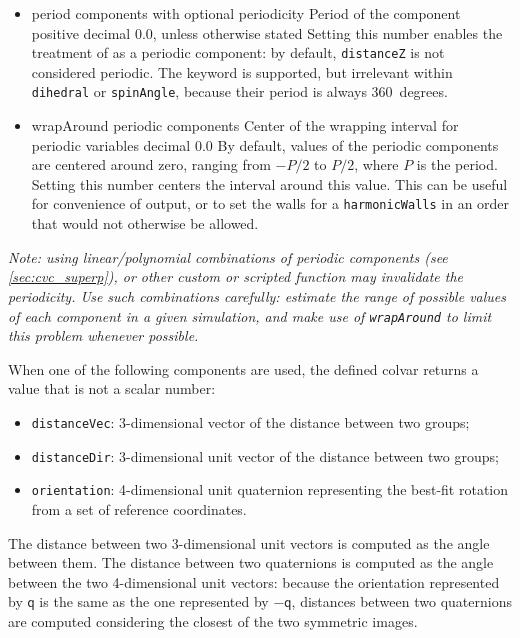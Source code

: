 \begin{itemize}
\item %
  \keydef
    {period}{%
    components with optional periodicity}{%
    Period of the component}{%
    positive decimal}{%
    0.0, unless otherwise stated}{%
    Setting this number enables the treatment of as
    a periodic component: by default, \texttt{distanceZ} is not
    considered periodic.  The keyword is supported, but irrelevant
    within \texttt{dihedral} or \texttt{spinAngle}, because their
    period is always 360~degrees.}

\item %
  \keydef
    {wrapAround}{%
    periodic components}{%
    Center of the wrapping interval for periodic variables}{%
    decimal}{%
    0.0}{%
    By default, values of the periodic components are centered around zero, ranging from $-P/2$ to $P/2$, where $P$ is the period.
    Setting this number centers the interval around this value.
    This can be useful for convenience of output, or to set the walls for a \texttt{harmonicWalls} in an order that would not otherwise be allowed.}
\end{itemize}

\emph{Note: using linear/polynomial combinations of periodic components (see \ref{sec:cvc_superp}), or other custom or scripted function may invalidate the periodicity.  Use such combinations carefully: estimate the range of possible values of each component in a given simulation, and make use of \texttt{wrapAround} to limit this problem whenever possible.}



When one of the following components are used, the defined colvar returns a value that is not a scalar number:
\begin{itemize}
\item \texttt{distanceVec}: 3-dimensional vector of the distance
  between two groups;
\item \texttt{distanceDir}: 3-dimensional unit vector of the distance
  between two groups;
\item \texttt{orientation}: 4-dimensional unit quaternion representing
  the best-fit rotation from a set of reference coordinates.
\end{itemize}
The distance between two 3-dimensional unit vectors is computed as the
angle between them.  The distance between two quaternions is computed
as the angle between the two 4-dimensional unit vectors: because the
orientation represented by $\mathsf{q}$ is the same as the one
represented by $-\mathsf{q}$, distances between two quaternions are
computed considering the closest of the two symmetric images.

